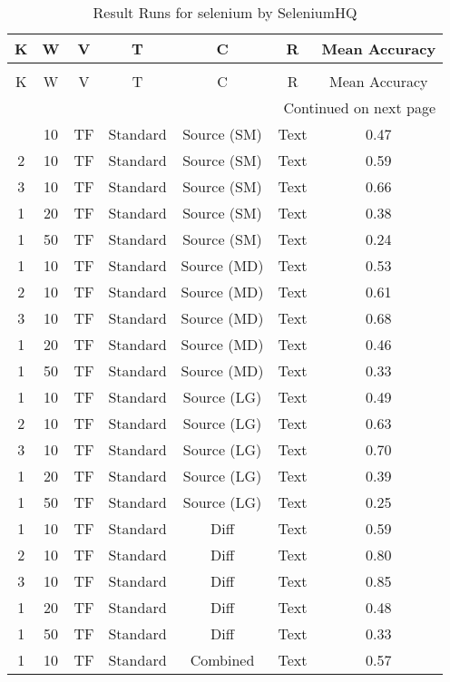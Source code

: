 \begin{longtable}{|c|c|c|c|c|c|c|}
\hline
K & W & V & T & C & R & Mean Accuracy \\
\hline
\endfirsthead
\caption[]{Continued from previous page} \\
\hline
K & W & V & T & C & R & Mean Accuracy \\
\hline
\endhead
\hline
\multicolumn{7}{r}{Continued on next page} \\
\endfoot
\hline
\caption{Result Runs for selenium by SeleniumHQ} 
\label{result-runs-selenium-seleniumhq}
\endlastfoot
1 & 10 & TF & Standard & Source (SM) & Text & 0.47 \\
\hline
2 & 10 & TF & Standard & Source (SM) & Text & 0.59 \\
\hline
3 & 10 & TF & Standard & Source (SM) & Text & 0.66 \\
\hline
1 & 20 & TF & Standard & Source (SM) & Text & 0.38 \\
\hline
1 & 50 & TF & Standard & Source (SM) & Text & 0.24 \\
\hline
1 & 10 & TF & Standard & Source (MD) & Text & 0.53 \\
\hline
2 & 10 & TF & Standard & Source (MD) & Text & 0.61 \\
\hline
3 & 10 & TF & Standard & Source (MD) & Text & 0.68 \\
\hline
1 & 20 & TF & Standard & Source (MD) & Text & 0.46 \\
\hline
1 & 50 & TF & Standard & Source (MD) & Text & 0.33 \\
\hline
1 & 10 & TF & Standard & Source (LG) & Text & 0.49 \\
\hline
2 & 10 & TF & Standard & Source (LG) & Text & 0.63 \\
\hline
3 & 10 & TF & Standard & Source (LG) & Text & 0.70 \\
\hline
1 & 20 & TF & Standard & Source (LG) & Text & 0.39 \\
\hline
1 & 50 & TF & Standard & Source (LG) & Text & 0.25 \\
\hline
1 & 10 & TF & Standard & Diff & Text & 0.59 \\
\hline
2 & 10 & TF & Standard & Diff & Text & 0.80 \\
\hline
3 & 10 & TF & Standard & Diff & Text & 0.85 \\
\hline
1 & 20 & TF & Standard & Diff & Text & 0.48 \\
\hline
1 & 50 & TF & Standard & Diff & Text & 0.33 \\
\hline
1 & 10 & TF & Standard & Combined & Text & 0.57 \\

\end{longtable}
